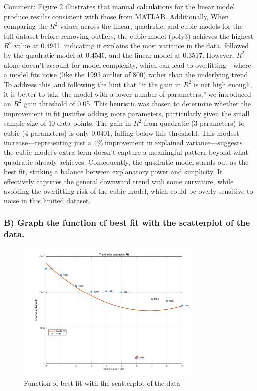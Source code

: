 \documentclass[12pt]{article}
\begin{document}
\begin{adjustwidth}{0cm}{0cm}
\uline{Comment:} 
Figure 2 illustrates that manual calculations for the linear model produce results consistent with those from MATLAB. Additionally, When comparing the $R^2$ values across the linear, quadratic, and cubic models for the full dataset before removing outliers, the cubic model (poly3) achieves the highest $R^2$ value at 0.4941, indicating it explains the most variance in the data, followed by the quadratic model at 0.4540, and the linear model at 0.3517. However, $R^2$ alone doesn’t account for model complexity, which can lead to overfitting—where a model fits noise (like the 1993 outlier of 800) rather than the underlying trend. To address this, and following the hint that ``if the gain in $R^2$ is not high enough, it is better to take the model with a lower number of parameters,'' we introduced an $R^2$ gain threshold of 0.05. This heuristic was chosen to determine whether the improvement in fit justifies adding more parameters, particularly given the small sample size of 10 data points. The gain in $R^2$ from quadratic (3 parameters) to cubic (4 parameters) is only 0.0401, falling below this threshold. This modest increase—representing just a 4\% improvement in explained variance—suggests the cubic model’s extra term doesn’t capture a meaningful pattern beyond what quadratic already achieves. Consequently, the quadratic model stands out as the best fit, striking a balance between explanatory power and simplicity. It effectively captures the general downward trend with some curvature, while avoiding the overfitting risk of the cubic model, which could be overly sensitive to noise in this limited dataset.
\end{adjustwidth}

\subsubsection*{B) Graph the function of best fit with the scatterplot of the data.}

\begin{figure}[H]
    \centering
    \includegraphics[width=0.8\textwidth]{3.png}
    \caption{Function of best fit with the scatterplot of the data}
\end{figure}
\end{document}
